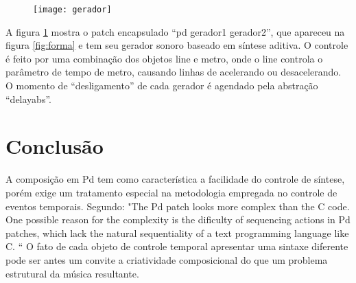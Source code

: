 \documentclass[12pt]{article}
\begin{document}
\begin{figure}[hp]
  \centering
  \texttt{[image: gerador]}
  \caption{}
    \label{fig:gerador}
\end{figure}

A figura \ref{fig:gerador} mostra o patch encapsulado “pd gerador1 gerador2”, que apareceu
na figura \ref{fig:forma} e tem seu gerador sonoro baseado em síntese aditiva. O controle é 
feito por uma combinação dos objetos line e metro, onde o line controla o parâmetro 
de tempo de  metro, causando linhas de acelerando ou desacelerando. O momento de 
“desligamento” de cada gerador é agendado pela abstração “delayabs”.

\section{Conclusão}
\label{sec:conclusao}


A composição em Pd tem como característica a facilidade do controle de síntese, porém exige
um tratamento especial na metodologia empregada no controle de eventos temporais. 
Segundo\cite{puckette04:divide}:
"The Pd patch looks more complex than the C code. One possible reason for
the complexity is the dificulty of sequencing actions in Pd patches, which lack
the natural sequentiality of a text programming language like C. “
O fato de cada objeto  de controle temporal apresentar uma sintaxe diferente
pode ser antes um convite a criatividade composicional do que um problema estrutural
da música resultante.

\nocite{*}



\end{document}
